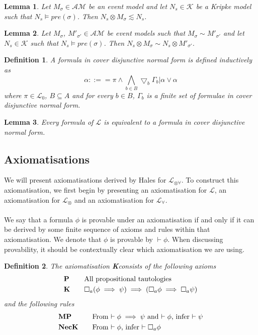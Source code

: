 \documentclass[12pt, a4paper, titlepage]{scrartcl}
\newtheorem{defn}{Definition}[subsection]
\newtheorem{lemma}{Lemma}[subsection]
\numberwithin{equation}{section}
\newcommand{\cover}{\bigtriangledown}
\newcommand{\lang}{\mathcal{L}}
\newcommand{\langRefine}{\lang_{\forall}}
\newcommand{\langActEx}{\lang_{\otimes}}
\newcommand{\langArbAct}{\lang_{\otimes\forall}}
\newcommand{\langProp}{\lang_0}
\newcommand{\AXK}{{\bf K}}
\newcommand{\axP}{{\bf P}}
\newcommand{\axK}{{\bf K}}
\newcommand{\axMP}{{\bf MP}}
\newcommand{\axNecK}{{\bf NecK}}
\newcommand{\kripkeClass}{\mathcal{K}}
\newcommand{\eventClass}{\mathcal{AM}}
\newcommand{\FIXME}{{\bf FIXME}}
\begin{document}
\begin{lemma} \label{eventModelsRefine}
Let $M_\sigma \in \eventClass$ be an event model and let $N_s \in \kripkeClass$ be a Kripke
model such that $N_s \models pre(\sigma)$.
Then $N_s \otimes M_\sigma \lesssim N_s$.
\end{lemma}

\begin{lemma} \label{eventModelEquivalent}
Let $M_\sigma$, $M'_{\sigma'} \in \eventClass$ be event models such that $M_\sigma \sim M'_{\sigma'}$
and let $N_s \in \kripkeClass$ such that $N_s \models pre(\sigma)$.
Then $N_s \otimes M_\sigma \sim N_s \otimes M'_{\sigma'}$.
\end{lemma}


\begin{defn} \label{coverNormal}
A formula in cover disjunctive normal form is defined inductively as
\[
	\alpha ::== \pi \land \bigwedge_{b \in B} \cover_b \Gamma_b | \alpha \lor \alpha
\]
where $\pi \in \langProp$, $B \subseteq A$ and for every $b \in B$, $\Gamma_b$ is a finite set of
formulae in cover disjunctive normal form.
\end{defn}

\begin{lemma} \label{allInCoverNormal}
Every formula of $\lang$ is equivalent to a formula in cover disjunctive normal form.
\end{lemma}

\subsection{Axiomatisations}
We will present axiomatisations derived by Hales for $\langArbAct$.
To construct this axiomatisation, we first begin by presenting an axiomatisation for $\lang$, an
axiomatisation for $\langActEx$ and an axiomatisation for $\langRefine$.\\
\\
We say that a formula $\phi$ is provable under an axiomatisation if and only if it can be derived by
some finite sequence of axioms and rules within that axiomatisation.
We denote that $\phi$ is provable by $\vdash \phi$.
When discussing provability, it should be contextually clear which axiomatisation we are using.

\begin{defn} \label{axiomK}
The axiomatisation \AXK consists of the following axioms
\begin{alignat*}{2}
	& \axP && \quad \text{All propositional tautologies} \\
	& \axK && \quad \Box_a(\phi \implies \psi) \implies (\Box_a \phi \implies \Box_a \psi)
\end{alignat*}
and the following rules
\begin{alignat*}{2}
	& \axMP && \quad \text{From $\vdash \phi \implies \psi$ and $\vdash \phi$, infer $\vdash \psi$} \\
	& \axNecK && \quad \text{From $\vdash \phi$, infer $\vdash \Box_a \phi$}
\end{alignat*}
\end{defn}
\end{document}
